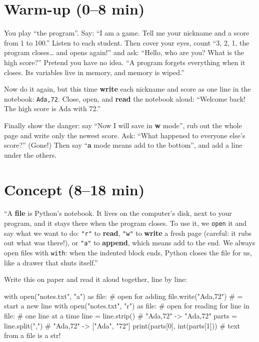 \section{Warm-up (0--8 min)}
\begin{unplugged}
You play \enquote{the program}. Say: \enquote{I am a game. Tell me your nickname and a score from 1 to 100.} Listen to each student.
Then cover your eyes, count \enquote{3, 2, 1, the program closes\ldots{} and opens again!} and ask: \enquote{Hello, who are you? What is the high score?}
Pretend you have no idea. \enquote{A program forgets everything when it closes. Its variables live in memory, and memory is wiped.}
\par Now do it again, but this time \textbf{write} each nickname and score as one line in the notebook: \texttt{Ada,72}. Close, open,
and \textbf{read} the notebook aloud: \enquote{Welcome back! The high score is Ada with 72.}
\par Finally show the danger: say \enquote{Now I will save in \textbf{w} mode}, rub out the whole page and write only the newest score.
Ask: \enquote{What happened to everyone else's score?} (Gone!) Then say \enquote{\textbf{a} mode means add to the bottom}, and add a line under the others.
\end{unplugged}

\section{Concept (8--18 min)}
\begin{teacherscript}[Say]
\enquote{A \textbf{file} is Python's notebook. It lives on the computer's disk, next to your program, and it stays there when the program closes.
To use it, we \texttt{open} it and say what we want to do: \texttt{"r"} to \textbf{read}, \texttt{"w"} to \textbf{write} a fresh page (careful: it rubs out
what was there!), or \texttt{"a"} to \textbf{append}, which means add to the end. We always open files with \texttt{with}: when the indented
block ends, Python closes the file for us, like a drawer that shuts itself.}
\end{teacherscript}
Write this on paper and read it aloud together, line by line:
\begin{pycode}
with open("notes.txt", "a") as file:    # open for adding
    file.write("Ada,72\n")              # \n = start a new line
with open("notes.txt", "r") as file:    # open for reading
    for line in file:                   # one line at a time
        line = line.strip()             # "Ada,72\n" -> "Ada,72"
        parts = line.split(",")         # "Ada,72"   -> ["Ada", "72"]
        print(parts[0], int(parts[1]))  # text from a file is a str!
\end{pycode}

